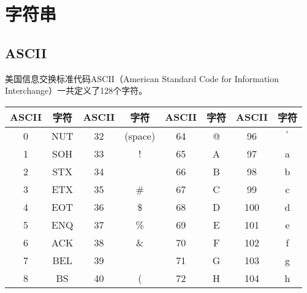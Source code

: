 \newpage

\section{字符串}

\subsection{ASCII}

美国信息交换标准代码ASCII（American Standard Code for Information Interchange）一共定义了128个字符。\\

\begin{longtable}{|c|c|c|c|c|c|c|c|}
	\hline
	\textbf{ASCII} & \textbf{字符} & \textbf{ASCII} & \textbf{字符} & \textbf{ASCII} & \textbf{字符}          & \textbf{ASCII} & \textbf{字符}          \\
	\hline
	0              & NUT           & 32             & (space)       & 64             & @                      & 96             & \lstinline|`| \\
	\hline
	1              & SOH           & 33             & !             & 65             & A                      & 97             & a                      \\
	\hline
	2              & STX           & 34             & \text{"}      & 66             & B                      & 98             & b                      \\
	\hline
	3              & ETX           & 35             & \#            & 67             & C                      & 99             & c                      \\
	\hline
	4              & EOT           & 36             & \$            & 68             & D                      & 100            & d                      \\
	\hline
	5              & ENQ           & 37             & \%            & 69             & E                      & 101            & e                      \\
	\hline
	6              & ACK           & 38             & \&            & 70             & F                      & 102            & f                      \\
	\hline
	7              & BEL           & 39             & \text{'}      & 71             & G                      & 103            & g                      \\
	\hline
	8              & BS            & 40             & (             & 72             & H                      & 104            & h                      \\

\end{longtable}
